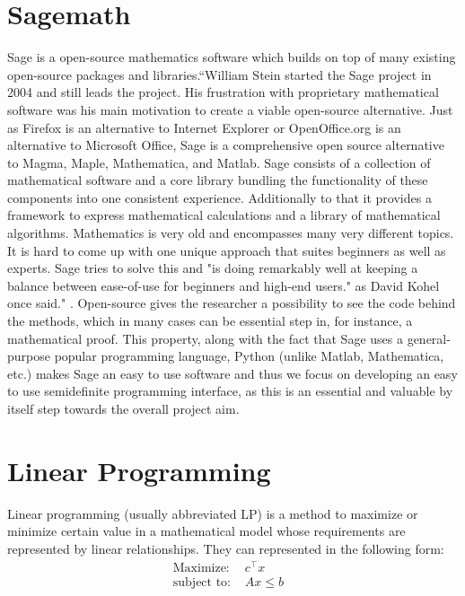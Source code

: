  



\section{Sagemath}
\label{sage}
Sage is a open-source mathematics software which builds on top of many existing open-source packages and libraries.``William Stein started the Sage project in 2004 and still leads the project. His frustration with proprietary mathematical software was his main motivation to create a viable open-source alternative. Just as Firefox is an alternative to Internet Explorer or OpenOffice.org is an alternative to Microsoft Office, Sage is a comprehensive open source alternative to Magma, Maple, Mathematica, and Matlab.
Sage consists of a collection of mathematical software and a core library bundling the functionality of these components into one consistent experience. Additionally to that it provides a framework to express mathematical calculations and a library of mathematical algorithms.
Mathematics is very old and encompasses many very different topics. It is hard to come up with one unique approach that suites beginners as well as experts. Sage tries to solve this and "is doing remarkably well at keeping a balance between ease-of-use for beginners and high-end users." as David Kohel once said."  \cite{sagepress}. Open-source gives the researcher a possibility to see the code behind the methods, which in many cases can be essential step in, for instance, a mathematical proof. This property, along with the fact that Sage uses a general-purpose popular programming language, Python (unlike Matlab, Mathematica, etc.) makes Sage an easy to use software and thus we focus on developing an easy to use semidefinite programming interface, as this is an essential and valuable by itself step towards the overall project aim.

\section{Linear Programming}
\label{lp}
Linear programming (usually abbreviated LP) is a method to maximize or minimize certain value in a mathematical model whose requirements are represented by linear relationships. They can represented in the following form:
\begin{align}
\text{Maximize: } &c^{\top}x& \\
\text{subject to: } &Ax \leq b& \\
\end{align} 


